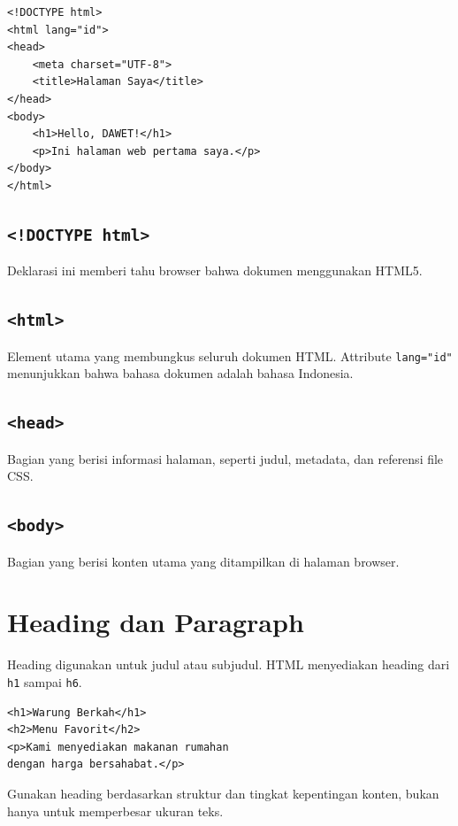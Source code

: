 \documentclass[11pt,a4paper]{article}
\begin{document}
\begin{lstlisting}[style=htmlstyle]
<!DOCTYPE html>
<html lang="id">
<head>
    <meta charset="UTF-8">
    <title>Halaman Saya</title>
</head>
<body>
    <h1>Hello, DAWET!</h1>
    <p>Ini halaman web pertama saya.</p>
</body>
</html>
\end{lstlisting}

\subsection{\texttt{<!DOCTYPE html>}}

Deklarasi ini memberi tahu browser bahwa dokumen menggunakan HTML5.

\subsection{\texttt{<html>}}

Element utama yang membungkus seluruh dokumen HTML. Attribute \texttt{lang="id"} menunjukkan bahwa bahasa dokumen adalah bahasa Indonesia.

\subsection{\texttt{<head>}}

Bagian yang berisi informasi halaman, seperti judul, metadata, dan referensi file CSS.

\subsection{\texttt{<body>}}

Bagian yang berisi konten utama yang ditampilkan di halaman browser.

\section{Heading dan Paragraph}

Heading digunakan untuk judul atau subjudul. HTML menyediakan heading dari \texttt{h1} sampai \texttt{h6}.

\begin{lstlisting}[style=htmlstyle]
<h1>Warung Berkah</h1>
<h2>Menu Favorit</h2>
<p>Kami menyediakan makanan rumahan
dengan harga bersahabat.</p>
\end{lstlisting}

Gunakan heading berdasarkan struktur dan tingkat kepentingan konten, bukan hanya untuk memperbesar ukuran teks.
\end{document}
